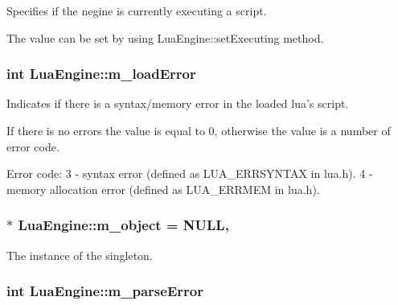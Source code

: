 Specifies if the negine is currently executing a script. 

The value can be set by using Lua\-Engine\-::set\-Executing method. \hypertarget{class_lua_engine_af8dca74620280060399b5b7dd937af44}{
\subsubsection[{m\-\_\-load\-Error}]{\setlength{\rightskip}{0pt plus 5cm}int Lua\-Engine\-::m\-\_\-load\-Error\hspace{0.3cm}{\ttfamily [private]}}}\label{class_lua_engine_af8dca74620280060399b5b7dd937af44}


Indicates if there is a syntax/memory error in the loaded lua's script. 

If there is no errors the value is equal to 0, otherwise the value is a number of error code. \begin{DoxyVerb}            Error code:
            3 - syntax error (defined as LUA_ERRSYNTAX in lua.h).
            4 - memory allocation error (defined as LUA_ERRMEM in lua.h).\end{DoxyVerb}
 \hypertarget{class_lua_engine_a27899d8e22a8da3067519562500b9c7f}{
\subsubsection[{m\-\_\-object}]{ $\ast$ Lua\-Engine\-::m\-\_\-object = N\-U\-L\-L\hspace{0.3cm}{\ttfamily [static]}, {\ttfamily [private]}}}\label{class_lua_engine_a27899d8e22a8da3067519562500b9c7f}


The instance of the singleton. 

\hypertarget{class_lua_engine_ac7c65e343f73a0dadcbe2d5f1a5842f3}{
\subsubsection[{m\-\_\-parse\-Error}]{\setlength{\rightskip}{0pt plus 5cm}int Lua\-Engine\-::m\-\_\-parse\-Error\hspace{0.3cm}{\ttfamily [private]}}}\label{class_lua_engine_ac7c65e343f73a0dadcbe2d5f1a5842f3}



